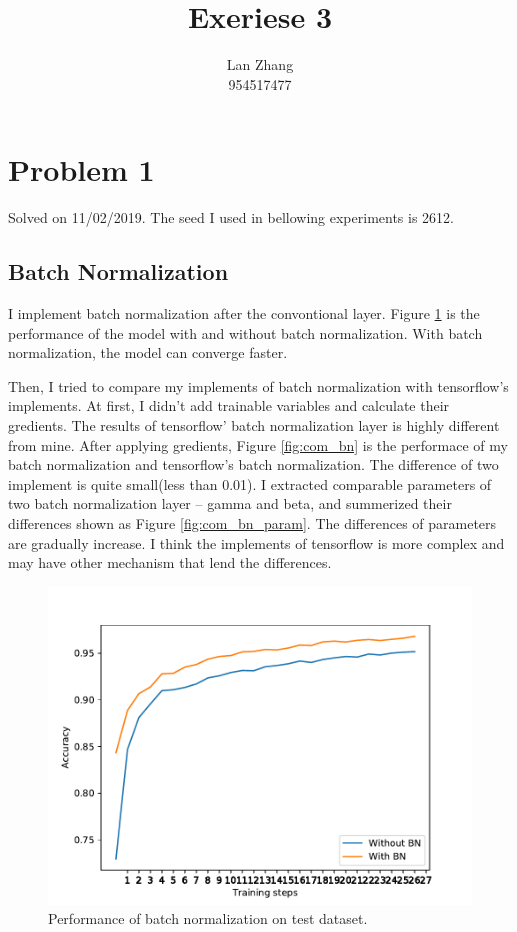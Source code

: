 \documentclass{article}
\title{Exeriese 3}
\author{%
  Lan Zhang\\
  954517477\\
}
\begin{document}
\maketitle

\section{Problem 1}

Solved on 11/02/2019. The seed I used in bellowing experiments is 2612. 



\subsection{Batch Normalization}
I implement batch normalization after the convontional layer. Figure \ref{fig:bn} is the performance of the model with and without batch normalization. With batch normalization, the model can converge faster.

Then, I tried to compare my implements of batch normalization with tensorflow's implements. At first, I didn't add trainable variables and calculate their gredients. The results of tensorflow' batch normalization layer is highly different from mine. After applying gredients, Figure \ref{fig:com_bn} is the performace of my batch normalization and tensorflow's batch normalization. The difference of two implement is quite small(less than 0.01). I extracted comparable parameters of two batch normalization layer -- gamma and  beta, and summerized their differences shown as Figure \ref{fig:com_bn_param}. The differences of parameters are gradually increase. I think the implements of tensorflow is more complex and may have other mechanism that lend the differences.

\begin{figure}[h]
\includegraphics[scale=0.8]{img/bn1.pdf}
\caption{Performance of batch normalization on test dataset.}
\label{fig:bn}
\end{figure}
\end{document}
